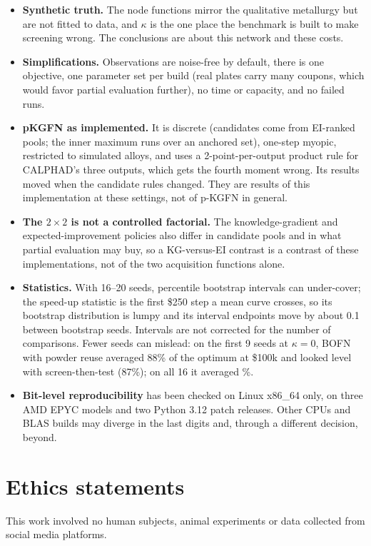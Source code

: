 \documentclass[11pt]{article}
\begin{document}
\begin{itemize}[leftmargin=*]
\item \textbf{Synthetic truth.} The node functions mirror the qualitative
metallurgy but are not fitted to data, and $\kappa$ is the one place the
benchmark is built to make screening wrong. The conclusions are about this
network and these costs.
\item \textbf{Simplifications.} Observations are noise-free by default, there
is one objective, one parameter set per build (real plates carry many coupons,
which would favor partial evaluation further), no time or capacity, and no
failed runs.
\item \textbf{pKGFN as implemented.} It is discrete (candidates come from
EI-ranked pools; the inner maximum runs over an anchored set), one-step myopic,
restricted to simulated alloys, and uses a 2-point-per-output product rule for
CALPHAD's three outputs, which gets the fourth moment wrong. Its results moved
when the candidate rules changed. They are results of this implementation at
these settings, not of p-KGFN in general.
\item \textbf{The $2\times2$ is not a controlled factorial.} The
knowledge-gradient and expected-improvement policies also differ in candidate
pools and in what partial evaluation may buy, so a KG-versus-EI contrast is a
contrast of these implementations, not of the two acquisition functions alone.
\item \textbf{Statistics.} With 16--20 seeds, percentile bootstrap intervals
can under-cover; the speed-up statistic is the first \$250 step a mean curve
crosses, so its bootstrap distribution is lumpy and its interval endpoints move
by about 0.1 between bootstrap seeds. Intervals are not corrected for the
number of comparisons. Fewer seeds can mislead: on the first 9 seeds at
$\kappa=0$, BOFN with powder reuse averaged 88\% of the optimum at \$100k and
looked level with screen-then-test (87\%); on all 16 it averaged
\%.
\item \textbf{Bit-level reproducibility} has been checked on Linux x86\_64
only, on three AMD EPYC models and two Python 3.12 patch releases. Other CPUs and BLAS builds may diverge in
the last digits and, through a different decision, beyond.
\end{itemize}

\section*{Ethics statements}
This work involved no human subjects, animal experiments or data collected from
social media platforms.
\end{document}
